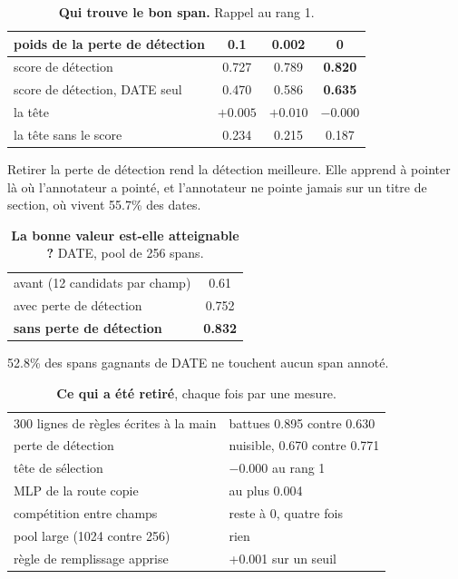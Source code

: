 \documentclass[11pt,a4paper]{article}
\begin{document}
\begin{table}[h]\centering
\caption*{\textbf{Qui trouve le bon span.} Rappel au rang 1.}
\begin{tabular}{lccc}
\toprule
poids de la perte de détection & 0.1 & 0.002 & \textbf{0} \\
\midrule
score de détection             & 0.727 & 0.789 & \textbf{0.820} \\
score de détection, DATE seul  & 0.470 & 0.586 & \textbf{0.635} \\
la tête                        & $+0.005$ & $+0.010$ & $-0.000$ \\
la tête sans le score          & 0.234 & 0.215 & 0.187 \\
\bottomrule
\end{tabular}
\end{table}

Retirer la perte de détection rend la détection meilleure.
Elle apprend à pointer là où l'annotateur a pointé, et l'annotateur ne pointe
jamais sur un titre de section, où vivent 55.7\% des dates.

\begin{table}[h]\centering
\caption*{\textbf{La bonne valeur est-elle atteignable ?} DATE, pool de 256 spans.}
\begin{tabular}{lc}
\toprule
avant (12 candidats par champ)   & 0.61 \\
avec perte de détection          & 0.752 \\
\textbf{sans perte de détection} & \textbf{0.832} \\
\bottomrule
\end{tabular}
\end{table}

52.8\% des spans gagnants de DATE ne touchent aucun span annoté.

\begin{table}[h]\centering
\caption*{\textbf{Ce qui a été retiré}, chaque fois par une mesure.}
\begin{tabular}{ll}
\toprule
300 lignes de règles écrites à la main & battues 0.895 contre 0.630 \\
perte de détection                     & nuisible, 0.670 contre 0.771 \\
tête de sélection                      & $-0.000$ au rang 1 \\
MLP de la route copie                  & au plus 0.004 \\
compétition entre champs               & reste à 0, quatre fois \\
pool large (1024 contre 256)           & rien \\
règle de remplissage apprise           & +0.001 sur un seuil \\
\bottomrule
\end{tabular}
\end{table}
\end{document}
